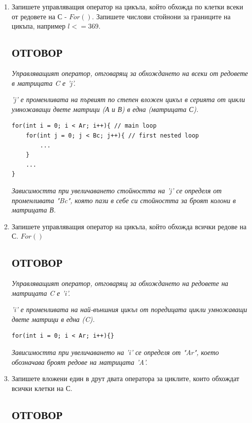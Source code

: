 \documentclass[12pt, a4paper]{article}
\begin{document}
\begin{enumerate}
\begin{enumerate}
{				}
				\item Запишете управляващия оператор на цикъла, който обхожда по клетки всеки от редовете на С -  $For ()$. Запишете числови стойнони за границите на цикъпа, например  $l <= 369$.
				\subsection{ОТГОВОР}
				{\color{blue!50!black}
					\textit{
						Управляващият оператор, отговарящ за обхождането на всеки от редовете
						в матрицата C е 'j'.}
						
					\textit{'j' е променливата на първият по степен вложен цикъл в серията от
						цикли умножаващи двете матрици (А и В) в една (матрицата С).}
					\begin{lstlisting}
for(int i = 0; i < Ar; i++){ // main loop
	for(int j = 0; j < Bc; j++){ // first nested loop
		...
	}
	...
}
					\end{lstlisting}
					\textit{Зависимостта при увеличаването стойността на 'j' се определя от
						променливата "Bc", която пази в себе си стойността за броят колони в
						матрицата В.}
					
				}
				
				\item Запишете управляващия оператор на цикъла, който обхожда всички редове на С. $For()$
				\subsection{ОТГОВОР}
				{\color{blue!50!black}
					\textit{
						Управляващият оператор, отговарящ за обхождането на редовете на
						матрицата C е 'i'.}
					
					\textit{'i' е променливата на най-външния цикъл от поредицата цикли умножаващи двете
						матрици в една (C).}
					\begin{lstlisting}
for(int i = 0; i < Ar; i++){}
					\end{lstlisting}
					\textit{Зависимостта при увеличаването на 'i' се определя от "Ar", което обозначава
						броят редове на матрицата 'A'.}
					
				}
				\item Запишете вложени един в друт двата оператора за циклите, които обхождат всички клетки на С.
				\subsection{ОТГОВОР}
				{\color{blue!50!black}
					
}
\end{enumerate}
\end{enumerate}
\end{document}
